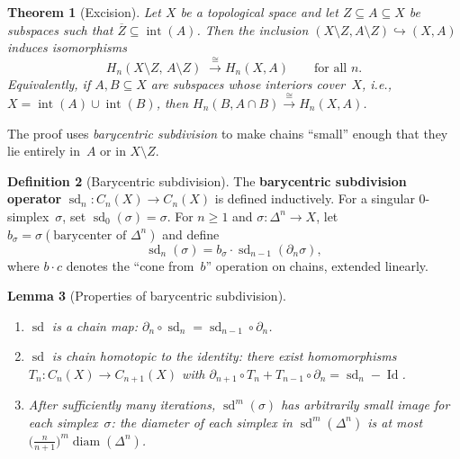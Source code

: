 \documentclass[12pt,a4paper,openany]{book}
\theoremstyle{definition}
\newtheorem{definition}{Definition}[chapter]
\theoremstyle{plain}
\newtheorem{theorem}[definition]{Theorem}
\newtheorem{lemma}[definition]{Lemma}
\theoremstyle{remark}
\DeclareMathOperator{\Id}{Id}
\begin{document}
\begin{theorem}[Excision]\label{thm:excision}
Let $X$ be a topological space and let $Z\subseteq A\subseteq X$ be
subspaces such that $\overline{Z}\subseteq\operatorname{int}(A)$.
Then the inclusion $(X\setminus Z,A\setminus Z)\hookrightarrow(X,A)$
induces isomorphisms
\[
  H_n(X\setminus Z,\, A\setminus Z)
  \;\xrightarrow{\;\cong\;}
  H_n(X,A)
  \qquad\text{for all } n.
\]
Equivalently, if $A,B\subseteq X$ are subspaces whose interiors cover~$X$,
i.e., $X=\operatorname{int}(A)\cup\operatorname{int}(B)$, then
$H_n(B,A\cap B)\xrightarrow{\cong} H_n(X,A)$.
\end{theorem}

The proof uses \emph{barycentric subdivision}
to make chains ``small'' enough that they lie entirely in~$A$ or in
$X\setminus Z$.

\begin{definition}[Barycentric subdivision]\label{def:barycentric-subdivision}
The \textbf{barycentric subdivision operator}
$\operatorname{sd}_n\colon C_n(X)\to C_n(X)$
is defined inductively.  For a singular $0$-simplex~$\sigma$, set
$\operatorname{sd}_0(\sigma)=\sigma$.  For $n\ge 1$ and
$\sigma\colon\Delta^n\to X$, let $b_\sigma=\sigma(\text{barycenter of }\Delta^n)$
and define
\[
  \operatorname{sd}_n(\sigma)
  = b_\sigma \cdot \operatorname{sd}_{n-1}(\partial_n\sigma),
\]
where $b\cdot c$ denotes the ``cone from~$b$'' operation on chains,
extended linearly.
\end{definition}

\begin{lemma}[Properties of barycentric subdivision]\label{lem:sd-properties}
\begin{enumerate}[label=\textup{(\roman*)},leftmargin=2.5em]
  \item $\operatorname{sd}$ is a chain map: $\partial_n\circ\operatorname{sd}_n = \operatorname{sd}_{n-1}\circ\partial_n$.
  \item $\operatorname{sd}$ is chain homotopic to the identity:
    there exist homomorphisms $T_n\colon C_n(X)\to C_{n+1}(X)$ with
    $\partial_{n+1}\circ T_n + T_{n-1}\circ\partial_n = \operatorname{sd}_n-\Id$.
  \item After sufficiently many iterations, $\operatorname{sd}^m(\sigma)$ has
    arbitrarily small image for each simplex~$\sigma$: the diameter of each
    simplex in $\operatorname{sd}^m(\Delta^n)$ is at most
    $\bigl(\frac{n}{n+1}\bigr)^m\operatorname{diam}(\Delta^n)$.
\end{enumerate}
\end{lemma}
\end{document}
